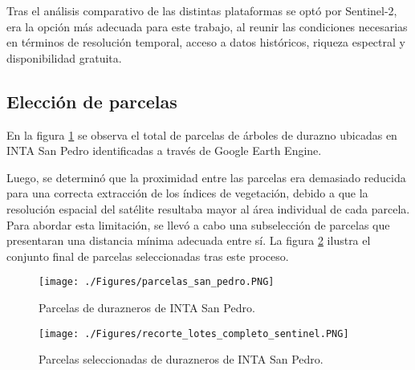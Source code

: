 Tras el análisis comparativo de las distintas plataformas se optó por Sentinel-2,
era la opción más adecuada para este trabajo, al reunir las condiciones 
necesarias en términos de resolución temporal, acceso a datos históricos, riqueza
espectral y disponibilidad gratuita.

\subsection{Elección de parcelas}

En la figura \ref{fig:parcelasSP} se observa el total de parcelas de árboles de durazno ubicadas 
en INTA San Pedro identificadas a través de Google Earth Engine. 

Luego, se determinó que la proximidad entre las parcelas era demasiado reducida para una correcta
extracción de los índices de vegetación, debido a que la resolución espacial del satélite 
resultaba mayor al área individual de cada parcela. Para abordar esta limitación, se llevó a cabo una 
subselección de parcelas que presentaran una distancia mínima adecuada entre sí. La figura \ref{fig:parcelasfinalSP} 
ilustra el conjunto final de parcelas seleccionadas tras este proceso.

\begin{figure}[h]
	\centering
	\texttt{[image: ./Figures/parcelas\_san\_pedro.PNG]}
	\caption{Parcelas de durazneros de INTA San Pedro.}
	\label{fig:parcelasSP}
\end{figure}

\begin{figure}[h]
	\centering
	\texttt{[image: ./Figures/recorte\_lotes\_completo\_sentinel.PNG]}
	\caption{Parcelas seleccionadas de durazneros de INTA San Pedro.}
	\label{fig:parcelasfinalSP}
\end{figure}
